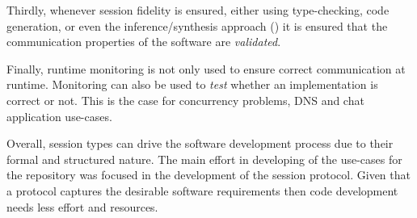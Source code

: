 Thirdly, whenever session fidelity is ensured, either
using type-checking, code generation, or even the
inference/synthesis approach ()
it is ensured that the communication properties of the
software are {\em validated}.

Finally, runtime monitoring is not only used to ensure
correct communication at runtime. Monitoring can also
be used to {\em test} whether an implementation
is correct or not.
This is the case for concurrency problems, DNS and
chat application use-cases.

Overall, session types can drive the software development
process due to their formal and structured nature.
The main effort in developing of the use-cases for the repository
was focused in the development of the session protocol.
Given that a protocol captures the desirable software requirements
then code development needs less effort and resources.
 









